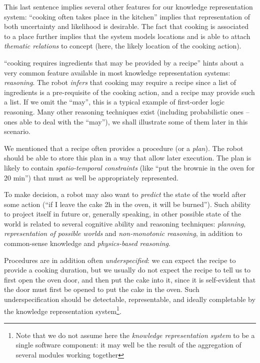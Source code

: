 This last sentence implies several other features for our knowledge
representation system: ``cooking often takes place in the kitchen'' implies
that representation of both uncertainty and likelihood is desirable. The fact
that cooking is associated to a place further implies that the system models
locations and is able to attach \emph{thematic relations} to concept
(here, the likely location of the cooking action).

``cooking requires ingredients that may be provided by a recipe'' hints about a
very common feature available in most knowledge representation systems:
\emph{reasoning}. The robot \emph{infers} that cooking may require a recipe
since a list of ingredients is a pre-requisite of the cooking action, and a
recipe may provide such a list. If we omit the ``may'', this is a typical
example of first-order logic reasoning. Many other reasoning techniques exist
(including probabilistic ones -- ones able to deal with the ``may''), we shall
illustrate some of them later in this scenario.

We mentioned that a recipe often provides a procedure (or a \emph{plan}). The robot
should be able to store this plan in a way that allow later execution.  The
plan is likely to contain \emph{spatio-temporal constraints} (like ``put
the brownie in the oven for 20 min'') that must as well be appropriately
represented.

To make decision, a robot may also want to \emph{predict} the state of the world
after some action (``if I leave the cake 2h in the oven, it will be burned'').
Such ability to project itself in future or, generally speaking, in other
possible state of the world is related to several cognitive ability and
reasoning techniques: \emph{planning}, \emph{representation of possible worlds}
and \emph{non-monotonic reasoning}, in addition to common-sense knowledge and
\emph{physics-based reasoning}.

Procedures are in addition often \emph{underspecified}: we can expect the recipe
to provide a cooking duration, but we usually do not expect the recipe to tell
us to first open the oven door, and then put the cake into it, since it is
self-evident that the door must first be opened to put the cake in the oven.
Such underspecification should be detectable, representable, and ideally
completable by the knowledge representation system\footnote{Note that we do not
assume here the {\it knowledge representation system} to be a single software
component: it may well be the result of the aggregation of several modules
working together}.

